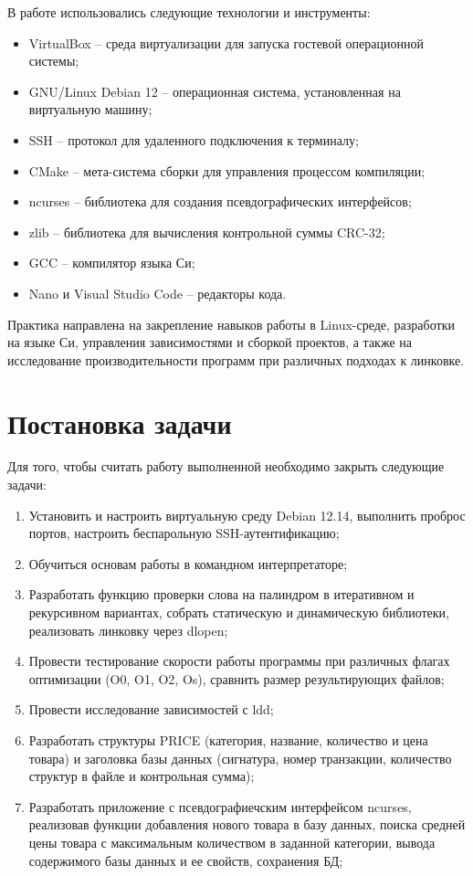 \documentclass[14pt]{extreport}
\begin{document}
{В работе использовались следующие технологии и инструменты:
\begin{itemize}
    \item VirtualBox -- среда виртуализации для запуска гостевой операционной системы;
    \item GNU/Linux Debian 12 -- операционная система, установленная на виртуальную машину;
    \item SSH -- протокол для удаленного подключения к терминалу;
    \item CMake -- мета-система сборки для управления процессом компиляции;
    \item ncurses -- библиотека для создания псевдографических интерфейсов;
    \item zlib -- библиотека для вычисления контрольной суммы CRC-32;
    \item GCC -- компилятор языка Си;
    \item Nano и Visual Studio Code -- редакторы кода.
\end{itemize}

Практика направлена на закрепление навыков работы в Linux-среде, разработки на языке Си, управления зависимостями и сборкой проектов, а также на исследование производительности программ при различных подходах к линковке.

\newpage
{\centering\section{Постановка задачи}}
Для того, чтобы считать работу выполненной необходимо закрыть следующие задачи:
\begin{enumerate}
    \item Установить и настроить виртуальную среду Debian 12.14, выполнить проброс портов, настроить беспарольную SSH-аутентификацию;
    \item Обучиться основам работы в командном интерпретаторе;
    \item Разработать функцию проверки слова на палиндром в итеративном и рекурсивном вариантах, собрать статическую и динамическую библиотеки, реализовать линковку через dlopen;
    \item Провести тестирование скорости работы программы при различных флагах оптимизации (O0, O1, O2, Os), сравнить размер результирующих файлов;
    \item Провести исследование зависимостей с ldd;
    \item Разработать структуры PRICE (категория, название, количество и цена товара) и заголовка базы данных (сигнатура, номер транзакции, количество структур в файле и контрольная сумма);
    \item Разработать приложение с псевдографиечским интерфейсом ncurses, реализовав функции добавления нового товара в базу данных, поиска средней цены товара с максимальным количеством в заданной категории, вывода содержимого базы данных и ее свойств, сохранения БД;


\end{enumerate}}
\end{document}
